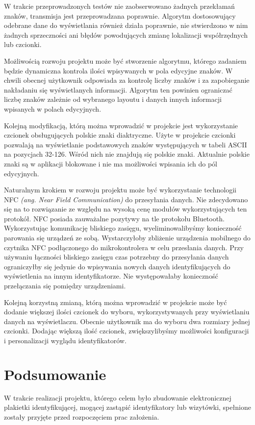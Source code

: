 \documentclass[a4paper,12pt, twoside]{article}
\begin{document}
    	W trakcie przeprowadzonych testów nie zaobserwowano żadnych przekłamań znaków, transmisja jest przeprowadzana poprawnie. Algorytm dostosowujący odebrane dane do wyświetlania również działa poprawnie, nie stwierdzono w nim żadnych sprzeczności ani błędów powodujących zmianę lokalizacji współrzędnych lub czcionki.
    	
    	Możliwością rozwoju projektu może być stworzenie algorytmu, którego zadaniem będzie dynamiczna kontrola ilości wpisywanych w pola edycyjne znaków. W chwili obecnej użytkownik odpowiada za kontrolę liczby znaków i za zapobieganie nakładaniu się wyświetlanych informacji. Algorytm ten powinien ograniczać liczbę znaków zależnie od wybranego layoutu i danych innych informacji wpisanych w polach edycyjnych.

        Kolejną modyfikacją, którą można wprowadzić w projekcie jest wykorzystanie czcionek obsługujących polskie znaki diaktryczne. Użyte w projekcie czcionki pozwalają na wyświetlanie podstawowych znaków występujących w tabeli ASCII na pozycjach 32-126. Wśród nich nie znajdują się polskie znaki. Aktualnie polskie znaki są w aplikacji blokowane i nie ma możliwości wpisania ich do pól edycyjnych.
        
        Naturalnym krokiem w rozwoju projektu może być wykorzystanie technologii NFC \textit{(ang. Near Field Communication)} do przesyłania danych. Nie zdecydowano się na to rozwiązanie ze względu na wysoką cenę modułów wykorzystujących ten protokół. NFC posiada zauważalne pozytywy na tle protokołu Bluetooth. Wykorzystując komunikację bliskiego zasięgu, wyeliminowalibyśmy konieczność parowania się urządzeń ze sobą. Wystarczyłoby zbliżenie urządzenia mobilnego do czytnika NFC podłączonego do mikrokontrolera w celu przesłania danych. Przy używaniu łączności bliskiego zasięgu czas potrzebny do przesyłania danych ograniczyłby się jedynie do wpisywania nowych danych identyfikujących do wyświetlenia na innym identyfikatorze. Nie występowałaby konieczność przełączania się pomiędzy urządzeniami.
    	
    	Kolejną korzystną zmianą, którą można wprowadzić w projekcie może być dodanie większej ilości czcionek do wyboru, wykorzystywanych przy wyświetlaniu danych na wyświetlaczu. Obecnie użytkownik ma do wyboru dwa rozmiary jednej czcionki. Dodając większą ilość czcionek, zwiększylibyśmy możliwości konfiguracji i personalizacji wyglądu identyfikatorów.

    	\section{Podsumowanie}
    	W trakcie realizacji projektu, którego celem było zbudowanie elektronicznej plakietki identyfikującej, mogącej zastąpić identyfikatory lub wizytówki, spełnione zostały przyjęte przed rozpoczęciem prac założenia.
    	
\end{document}
